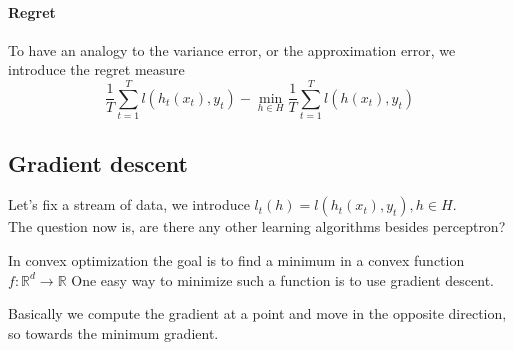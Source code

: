 \paragraph{Regret}
To have an analogy to the variance error, or the approximation error, 
we introduce the regret measure
$$\frac{1}{T}\sum_{t=1}^T l(h_t(x_t), y_t) - \min_{h\in H}\frac{1}{T}\sum_{t=1}^T l(h(x_t), y_t)$$

\subsection{Gradient descent}
Let's fix a stream of data, we introduce $l_t(h) = l(h_t(x_t), y_t), h\in H$.\\
The question now is, are there any other learning algorithms 
besides perceptron?

In convex optimization the goal is to find a minimum in a convex 
function $f : \mathbb{R}^d \rightarrow \mathbb{R}$
One easy way to minimize such a function is to use gradient descent.

Basically we compute the gradient at a point and move in the opposite direction, 
so towards the minimum gradient.







